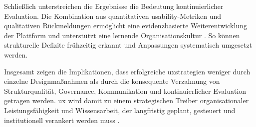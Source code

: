 Schließlich unterstreichen die Ergebnisse die Bedeutung kontinuierlicher Evaluation. Die Kombination aus quantitativen \Gls{usability}-Metriken und qualitativen Rückmeldungen ermöglicht eine evidenzbasierte Weiterentwicklung der Plattform und unterstützt eine lernende Organisationskultur \cite{121:NNGUsabilityTesting,124:Triangulation2023}. So können strukturelle Defizite frühzeitig erkannt und Anpassungen systematisch umgesetzt werden.

Insgesamt zeigen die Implikationen, dass erfolgreiche \Gls{uxstrategien} weniger durch einzelne Designmaßnahmen als durch die konsequente Verzahnung von Strukturqualität, Governance, Kommunikation und kontinuierlicher Evaluation getragen werden. \Gls{ux} wird damit zu einem strategischen Treiber organisationaler Leistungsfähigkeit und Wissensarbeit, der langfristig geplant, gesteuert und institutionell verankert werden muss \cite{417:Benyon2019,403:Westerman2014}.
